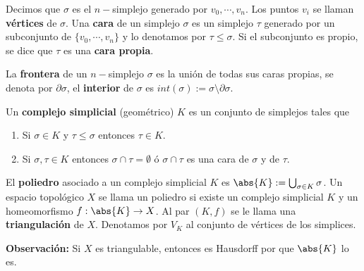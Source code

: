 \documentclass{article}
\begin{document}
\noindent Decimos que $\sigma$ es el $n-$simplejo generado por $v_{0},\cdots,v_{n}$. Los puntos 
$v_{i}$ se llaman \textbf{vértices} de $\sigma$. Una \textbf{cara} de un simplejo $\sigma$ es 
un simplejo $\tau$ generado por un subconjunto de $\{v_{0},\cdots,v_{n}\}$ y lo denotamos por 
$\tau\leq\sigma$. Si el subconjunto es propio, se dice que $\tau$ es una \textbf{cara propia}.

\vspace{2mm}
\noindent La \textbf{frontera} de un $n-$simplejo $\sigma$ es la unión de todas sus caras propias, 
se denota por $\partial\sigma$, el \textbf{interior} de $\sigma$ es $int(\sigma):=
\sigma\setminus\partial\sigma$.

\begin{center}
\end{center}

\vspace{2mm}
\begin{dfn}
    Un \textbf{complejo simplicial} (geométrico) $K$ es un conjunto de simplejos tales que
    \begin{enumerate}
        \item Si $\sigma\in K$ y $\tau\leq\sigma$ entonces $\tau\in K$.
        \item Si $\sigma,\tau\in K$ entonces $\sigma\cap\tau=\emptyset$ ó $\sigma\cap\tau$ es una
        cara de $\sigma$ y de $\tau$.
    \end{enumerate}
\end{dfn}
\noindent El \textbf{poliedro} asociado a un complejo simplicial $K$ es 
$\abs{K}:=\bigcup_{\sigma\in K}\sigma$. Un espacio topológico $X$ se llama un poliedro si existe
un complejo simplicial $K$ y un homeomorfismo $f:\abs{K}\to X$. Al par $(K,f)$ se le llama una 
\textbf{triangulación} de $X$. Denotamos por $V_{K}$ al conjunto de vértices de los simplices.

\vspace{2mm}
\noindent\textbf{Observación:} Si $X$ es triangulable, entonces es Hausdorff por que $\abs{K}$ 
lo es.
\end{document}
